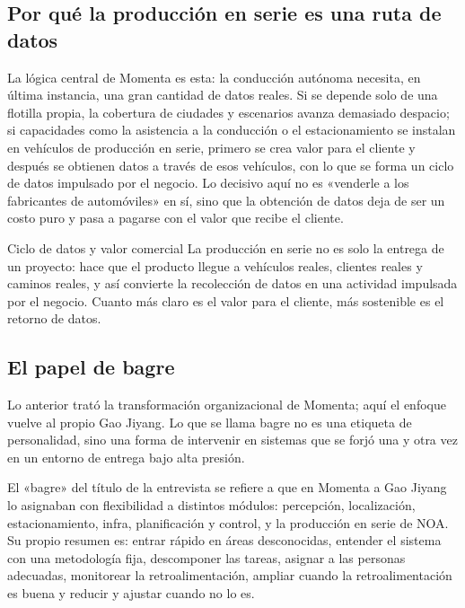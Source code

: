 \documentclass[a4paper]{article}
\begin{document}
\subsection{Por qué la producción en serie es una ruta de datos}

La lógica central de Momenta es esta: la conducción autónoma necesita, en última instancia, una gran cantidad de datos reales. Si se depende solo de una flotilla propia, la cobertura de ciudades y escenarios avanza demasiado despacio; si capacidades como la asistencia a la conducción o el estacionamiento se instalan en vehículos de producción en serie, primero se crea valor para el cliente y después se obtienen datos a través de esos vehículos, con lo que se forma un ciclo de datos impulsado por el negocio. Lo decisivo aquí no es «venderle a los fabricantes de automóviles» en sí, sino que la obtención de datos deja de ser un costo puro y pasa a pagarse con el valor que recibe el cliente.

\begin{importantbox}{Ciclo de datos y valor comercial}
La producción en serie no es solo la entrega de un proyecto: hace que el producto llegue a vehículos reales, clientes reales y caminos reales, y así convierte la recolección de datos en una actividad impulsada por el negocio. Cuanto más claro es el valor para el cliente, más sostenible es el retorno de datos.
\end{importantbox}

\subsection{El papel de bagre}

Lo anterior trató la transformación organizacional de Momenta; aquí el enfoque vuelve al propio Gao Jiyang. Lo que se llama bagre no es una etiqueta de personalidad, sino una forma de intervenir en sistemas que se forjó una y otra vez en un entorno de entrega bajo alta presión.

El «bagre» del título de la entrevista se refiere a que en Momenta a Gao Jiyang lo asignaban con flexibilidad a distintos módulos: percepción, localización, estacionamiento, infra, planificación y control, y la producción en serie de NOA. Su propio resumen es: entrar rápido en áreas desconocidas, entender el sistema con una metodología fija, descomponer las tareas, asignar a las personas adecuadas, monitorear la retroalimentación, ampliar cuando la retroalimentación es buena y reducir y ajustar cuando no lo es.
\end{document}
